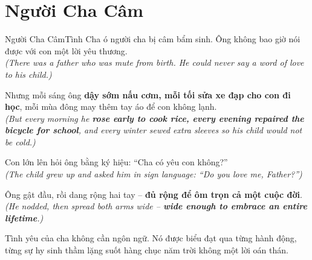 \section{Người Cha Câm}
\begin{truyen}{Người Cha Câm}{Tình Cha}
ó người cha bị câm bẩm sinh. Ông không bao giờ nói được với con một lời yêu thương.\\
\textit{(There was a father who was mute from birth. He could never say a word of love to his child.)}

Nhưng mỗi sáng ông \textbf{dậy sớm nấu cơm, mỗi tối sửa xe đạp cho con đi học}, mỗi mùa đông may thêm tay áo để con không lạnh.\\
\textit{(But every morning he \textbf{rose early to cook rice, every evening repaired the bicycle for school}, and every winter sewed extra sleeves so his child would not be cold.)}

Con lớn lên hỏi ông bằng ký hiệu: ``Cha có yêu con không?''\\
\textit{(The child grew up and asked him in sign language: ``Do you love me, Father?'')}

Ông gật đầu, rồi dang rộng hai tay – \textbf{đủ rộng để ôm trọn cả một cuộc đời}.\\
\textit{(He nodded, then spread both arms wide – \textbf{wide enough to embrace an entire lifetime}.)}
\end{truyen}
\begin{baihoc}
  Tình yêu của cha không cần ngôn ngữ. Nó được biểu đạt qua từng hành động, từng sự hy sinh thầm lặng suốt hàng chục năm trời không một lời oán thán.
\end{baihoc}

